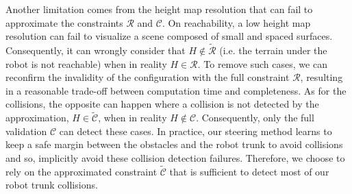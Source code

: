
Another limitation comes from the height map resolution that can fail to approximate the constraints $\mathcal{R}$ and $\mathcal{C}$.
On reachability, a low height map resolution can fail to visualize a scene composed of small and spaced surfaces. Consequently, it can wrongly consider that $H \notin \tilde{\mathcal{R}}$ (i.e. the terrain under the robot is not reachable) when in reality $H \in \mathcal{R}$.
To remove such cases, we can reconfirm the invalidity of the configuration with the full constraint $\mathcal{R}$, resulting in a reasonable trade-off between computation time and completeness.
As for the collisions, the opposite can happen where a collision is not detected by the approximation, $H \in \tilde{\mathcal{C}}$, when in reality $H \notin \mathcal{C}$. Consequently, only the full validation $\mathcal{C}$ can detect these cases.
In practice, our steering method learns to keep a safe margin between the obstacles and the robot trunk to avoid collisions and so, implicitly avoid these collision detection failures. 
Therefore, we choose to rely on the approximated constraint $\tilde{\mathcal{C}}$ that is sufficient to detect most of our robot trunk collisions.
